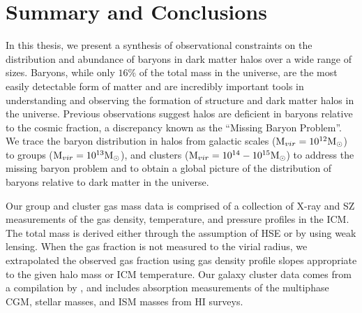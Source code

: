 \chapter{Summary and Conclusions}
\label{chap:Conclusions}

In this thesis, we present a synthesis of observational constraints on
the distribution and abundance of baryons in dark matter halos over a
wide range of sizes. Baryons, while only $16\%$ of the total mass in
the universe, are the most easily detectable form of matter and are
incredibly important tools in understanding and observing the
formation of structure and dark matter halos in the universe. Previous
observations suggest halos are deficient in baryons relative to the
cosmic fraction, a discrepancy known as the ``Missing Baryon
Problem''. We trace the baryon distribution in halos from galactic
scales ($\textrm{M\ensuremath{_{vir}}}{} = 10^{12}\textrm{M}_\odot$) to groups ($\textrm{M\ensuremath{_{vir}}}{}=10^{13}\textrm{M}_\odot$),
and clusters ($\textrm{M\ensuremath{_{vir}}}{} = 10^{14}-10^{15}\textrm{M}_\odot$) to address the missing
baryon problem and to obtain a global picture of the distribution of
baryons relative to dark matter in the universe. 

Our group and cluster gas mass data is comprised of a collection of X-ray and
SZ measurements of the gas density, temperature, and pressure profiles
in the ICM. The total mass is derived either through the assumption of
HSE or by using weak lensing. When the gas fraction is not measured to
the virial radius, we extrapolated the observed gas fraction using gas
density profile slopes appropriate to the given halo mass or ICM
temperature. Our galaxy cluster data comes from a compilation by
\citet{Werk2014}, and includes absorption measurements of the
multiphase CGM, stellar masses, and ISM masses from HI surveys.

